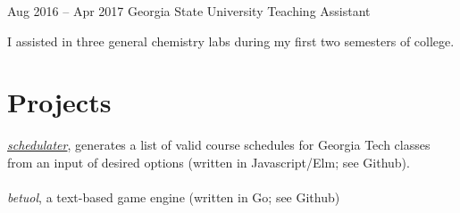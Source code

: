 \documentclass{tccv}
\begin{document}
\begin{minipage}[t]{0.65\textwidth}
\begin{eventlist}
\item{Aug 2016 -- Apr 2017}
     {Georgia State University}
     {Teaching Assistant}

    I assisted in three general chemistry labs during my first two semesters of college.

\section{Projects}

\href{https://stnma7e.github.io/schedulater}{\emph{schedulater}}, generates a list of valid course schedules for Georgia Tech classes from an input of desired options (written in Javascript/Elm; see Github). 
\\ \\
\emph{betuol}, a text-based game engine (written in Go; see Github)

\end{eventlist}
\end{minipage}
\end{document}
